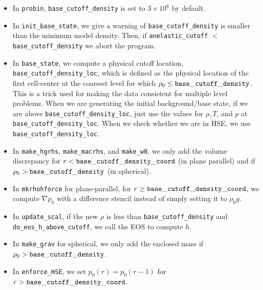 \begin{itemize}

\item In {\tt probin}, {\tt base\_cutoff\_density} is set to $3\times 10^6$ by default.

\item In {\tt init\_base\_state}, we give a warning of {\tt base\_cutoff\_density}
  is smaller than the minimum model density.  Then, if {\tt anelastic\_cutoff} 
  $<$ {\tt base\_cutoff\_density} we abort the program.

\item In {\tt base\_state}, we compute a physical cutoff location,
  {\tt base\_cutoff\_density\_loc}, which is defined as the physical
  location of the first cell-center at the coarsest level for which
  $\rho_0 \le {\tt base\_cutoff\_density}$.  This is a trick used for making
  the data consistent for multiple level problems.  When we are generating the 
  initial background/base state, if we are above {\tt base\_cutoff\_density\_loc}, 
  just use the values for $\rho,T$, and $p$ at {\tt base\_cutoff\_density\_loc}.
  When we check whether we are in HSE, we use {\tt base\_cutoff\_density\_loc}.

\item In {\tt make\_hgrhs}, {\tt make\_macrhs}, and {\tt make\_w0}, 
  we only add the volume discrepancy for $r < {\tt base\_cutoff\_density\_coord}$
  (in plane parallel) and if $\rho_0 > {\tt base\_cutoff\_density}$ (in spherical).

\item In {\tt mkrhohforce} for plane-parallel, for
  $r \ge {\tt base\_cutoff\_density\_coord}$, we
  compute $\nabla p_0$ with a difference stencil instead of simply
  setting it to $\rho_0 g$.

\item In {\tt update\_scal}, if the new $\rho$ is less than 
  {\tt base\_cutoff\_density} and {\tt do\_eos\_h\_above\_cutoff},  
  we call the EOS to compute $h$.

\item In {\tt make\_grav} for spherical, we only add the enclosed mass if
  $\rho_0 > {\tt base\_cutoff\_density}$.

\item In {\tt enforce\_HSE}, we set $p_0(r) = p_0(r-1)$ for 
  $r > {\tt base\_cutoff\_density\_coord}$.

\end{itemize}

